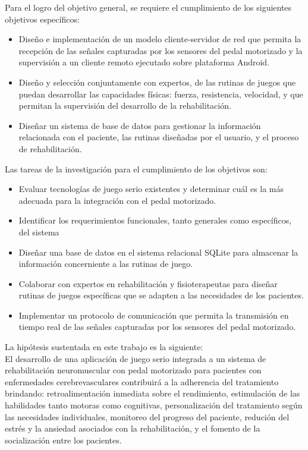 \begin{introduction}
    \vspace{5pt}
    Para el logro del objetivo general, se requiere el cumplimiento de los siguientes objetivos específicos:
    \begin{itemize}
        \item Diseño e implementación de un modelo cliente-servidor de red que permita la
        recepción de las señales capturadas por los sensores del pedal motorizado
        y la supervisión a un cliente remoto ejecutado sobre plataforma Android.
        \item  Diseño y selección conjuntamente con expertos, de las rutinas de juegos que
        puedan desarrollar las capacidades físicas: fuerza, resistencia, velocidad, y que
        permitan la supervisión del desarrollo de la rehabilitación.
        \item Diseñar un sistema de base de datos para gestionar la información relacionada con
        el paciente, las rutinas diseñadas por el usuario, y el proceso de
        rehabilitación.
    \end{itemize}
    Las tareas de la investigación para el cumplimiento de los objetivos son:
    \begin{itemize}
        \item Evaluar tecnologías de juego serio existentes y determinar cuál es la más adecuada para la integración con el pedal motorizado.
        \item Identificar los requerimientos funcionales, tanto generales como específicos, del sistema
        \item Diseñar una base de datos en el sistema relacional SQLite para almacenar la información concerniente a las rutinas de juego. 
        \item Colaborar con expertos en rehabilitación y fisioterapeutas para diseñar rutinas de juegos específicas que se adapten a las necesidades de los pacientes.
        \item Implementar un protocolo de comunicación que permita la transmisión en tiempo real de las señales capturadas por los sensores del pedal motorizado. 
    \end{itemize}

    La hipótesis sustentada en este trabajo es la siguiente:\\
    El desarrollo de una aplicación de juego serio integrada a un sistema de rehabilitación neuromuscular con pedal motorizado para pacientes con
    enfermedades cerebrevasculares contribuirá a la adherencia del tratamiento brindando: retroalimentación inmediata sobre el rendimiento, estimulación de las 
    habilidades tanto motoras como cognitivas, personalización del tratamiento según las necesidades individuales, monitoreo del progreso del paciente, redución 
    del estrés y la ansiedad asociados con la rehabilitación, y el fomento de la socialización entre los pacientes.


\end{introduction}

